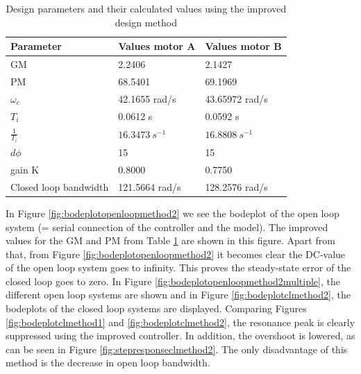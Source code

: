 \documentclass[a4paper,kul]{kulakarticle} %
\begin{document}
\begin{table}[htp!]
	
	\centering
	
	\begin{tabular}{|l|l|l|}
		\hline
		Parameter                & Values motor A & Values motor B                       \\ \hline
		GM                       & 2.2406 &        2.1427                \\
		PM                       & 68.5401\degree & 69.1969\degree \\
		$\omega_c$ & 42.1655 rad/s              &  43.65972 rad/s\\
		$T_i $                    & 0.0612 s    &     0.0592 s           \\
		$\frac{1}{T_i}$                    & $\SI{16.3473}{s^{-1}} $  &  $\SI{16.8808}{s^{-1}} $                 \\
		$d\phi$             & 15\degree    & 15\degree \\
		gain K 	 		& 0.8000  & 0.7750 \\ 
		Closed loop bandwidth & 121.5664 rad/s & 128.2576 rad/s \\ \hline
	\end{tabular}
	\caption{Design parameters and their calculated values using the improved design method}
	\label{tab:valuesmethod2}
\end{table}
In Figure \ref{fig:bodeplotopenloopmethod2} we see the bodeplot of the open loop system (= serial connection of the controller and the model). The improved values for the GM and PM from Table \ref{tab:valuesmethod2} are shown in this figure. Apart from that, from Figure \ref{fig:bodeplotopenloopmethod2} it becomes clear the DC-value of the open loop system goes to infinity. This proves the steady-state error of the closed loop goes to zero. In Figure \ref{fig:bodeplotopenloopmethod2multiple}, the different open loop systems are shown and in Figure \ref{fig:bodeplotclmethod2}, the bodeplots of the closed loop systems are displayed. Comparing Figures \ref{fig:bodeplotclmethod1} and \ref{fig:bodeplotclmethod2}, the resonance peak is clearly suppressed using the improved controller. In addition, the overshoot is lowered, as can be seen in Figure \ref{fig:stepresponseclmethod2}. The only disadvantage of this method is the decrease in open loop bandwidth. 
\end{document}
